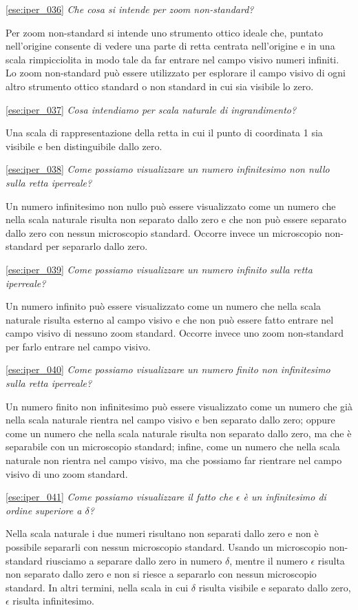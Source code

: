 \ref{ese:iper_036} 
\emph{Che cosa si intende per zoom non-standard?}

Per zoom non-standard si intende uno strumento ottico ideale che, puntato 
nell'origine consente di vedere una parte di retta centrata nell'origine e in 
una scala rimpicciolita in modo tale da far entrare nel campo visivo numeri 
infiniti. Lo zoom non-standard può essere utilizzato per esplorare il campo 
visivo di ogni altro strumento ottico standard o non standard in cui sia 
visibile lo zero.

\ref{ese:iper_037} 
\emph{Cosa intendiamo per scala naturale di ingrandimento?}

Una scala di rappresentazione della retta in cui il punto di coordinata 1 sia 
visibile e ben distinguibile dallo zero.

\ref{ese:iper_038} 
\emph{Come possiamo visualizzare un numero infinitesimo non nullo sulla retta
iperreale?}

Un numero infinitesimo non nullo può essere visualizzato come un numero che 
nella scala naturale risulta non separato dallo zero e che non può essere 
separato dallo zero con nessun microscopio standard. Occorre invece un 
microscopio non-standard per separarlo dallo zero.

\ref{ese:iper_039} 
\emph{Come possiamo visualizzare un numero infinito sulla retta iperreale?}

Un numero infinito può essere visualizzato come un numero che nella scala 
naturale risulta esterno al campo visivo e che non può essere fatto entrare nel 
campo visivo di nessuno zoom standard. Occorre invece uno zoom non-standard per 
farlo entrare nel campo visivo.

\ref{ese:iper_040} 
\emph{Come possiamo visualizzare un numero finito non infinitesimo sulla retta
iperreale?}

Un numero finito non infinitesimo può essere visualizzato come un numero che 
già nella scala naturale rientra nel campo visivo e ben separato dallo zero; 
oppure come un numero che nella scala naturale risulta non separato dallo zero, 
ma che è separabile con un microscopio standard; infine, come un numero che 
nella scala naturale non rientra nel campo visivo, ma che possiamo far 
rientrare nel campo visivo di uno zoom standard.

\ref{ese:iper_041} 
\emph{Come possiamo visualizzare il fatto che \(\epsilon\) è un infinitesimo di 
ordine superiore a \(\delta\)?}

Nella scala naturale i due numeri risultano non separati dallo zero e non è 
possibile separarli con nessun microscopio standard. Usando un microscopio 
non-standard riusciamo a separare dallo zero in numero \(\delta\), mentre il 
numero \(\epsilon\) risulta non separato dallo zero e non si riesce a separarlo 
con nessun microscopio standard. In altri termini, nella scala in cui 
\(\delta\) risulta visibile e separato dallo zero, 
\(\epsilon\) risulta infinitesimo.

